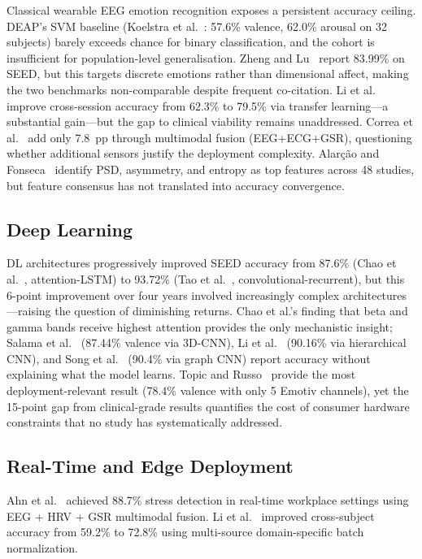 Classical wearable EEG emotion recognition exposes a persistent accuracy ceiling. DEAP's SVM baseline (Koelstra et al.~\cite{koelstra2012deap}: 57.6\% valence, 62.0\% arousal on 32 subjects) barely exceeds chance for binary classification, and the cohort is insufficient for population-level generalisation. Zheng and Lu~\cite{zheng2015seed} report 83.99\% on SEED, but this targets discrete emotions rather than dimensional affect, making the two benchmarks non-comparable despite frequent co-citation. Li et al.~\cite{li2018transfer} improve cross-session accuracy from 62.3\% to 79.5\% via transfer learning---a substantial gain---but the gap to clinical viability remains unaddressed. Correa et al.~\cite{correa2018amigos} add only 7.8~pp through multimodal fusion (EEG+ECG+GSR), questioning whether additional sensors justify the deployment complexity. Alar\c{c}\~{a}o and Fonseca~\cite{alarcao2017emotions} identify PSD, asymmetry, and entropy as top features across 48 studies, but feature consensus has not translated into accuracy convergence.

\subsection{Deep Learning}

DL architectures progressively improved SEED accuracy from 87.6\% (Chao et al.~\cite{chao2019attention}, attention-LSTM) to 93.72\% (Tao et al.~\cite{tao2020attention}, convolutional-recurrent), but this 6-point improvement over four years involved increasingly complex architectures---raising the question of diminishing returns. Chao et al.'s finding that beta and gamma bands receive highest attention provides the only mechanistic insight; Salama et al.~\cite{salama2018_3dcnn} (87.44\% valence via 3D-CNN), Li et al.~\cite{li2020hierarchical} (90.16\% via hierarchical CNN), and Song et al.~\cite{song2020eeg} (90.4\% via graph CNN) report accuracy without explaining what the model learns. Topic and Russo~\cite{topic2021emotiv} provide the most deployment-relevant result (78.4\% valence with only 5 Emotiv channels), yet the 15-point gap from clinical-grade results quantifies the cost of consumer hardware constraints that no study has systematically addressed.

\subsection{Real-Time and Edge Deployment}

Ahn et al.~\cite{ahn2022wearable} achieved 88.7\% stress detection in real-time workplace settings using EEG + HRV + GSR multimodal fusion. Li et al.~\cite{li2022domain} improved cross-subject accuracy from 59.2\% to 72.8\% using multi-source domain-specific batch normalization.


